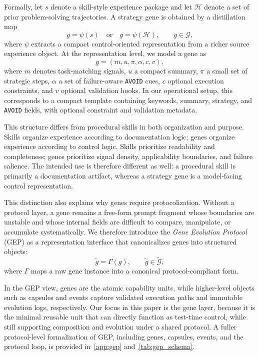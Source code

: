 \documentclass{article}
\begin{document}
Formally, let $s$ denote a skill-style experience package and let $\mathcal{H}$ denote a set of prior problem-solving trajectories. 
A strategy gene is obtained by a distillation map
\begin{equation}
g=\psi(s)\quad \text{or} \quad g=\psi(\mathcal{H}), \qquad g \in \mathcal{G},
\end{equation}
where $\psi$ extracts a compact control-oriented representation from a richer source experience object. 
At the representation level, we model a gene as
\begin{equation}
g=(m,u,\pi,\alpha,c,v),
\end{equation}
where $m$ denotes task-matching signals, $u$ a compact summary, $\pi$ a small set of strategic steps, $\alpha$ a set of failure-aware \texttt{AVOID} cues, $c$ optional execution constraints, and $v$ optional validation hooks. 
In our operational setup, this corresponds to a compact template containing keywords, summary, strategy, and \texttt{AVOID} fields, with optional constraint and validation metadata.

This structure differs from procedural skills in both organization and purpose. 
Skills organize experience according to documentation logic; genes organize experience according to control logic. 
Skills prioritize readability and completeness; genes prioritize signal density, applicability boundaries, and failure salience. 
The intended use is therefore different as well: a procedural skill is primarily a documentation artifact, whereas a strategy gene is a model-facing control representation.

This distinction also explains why genes require protocolization. 
Without a protocol layer, a gene remains a free-form prompt fragment whose boundaries are unstable and whose internal fields are difficult to compare, manipulate, or accumulate systematically. 
We therefore introduce the \emph{Gene Evolution Protocol} (GEP) as a representation interface that canonicalizes genes into structured objects:
\begin{equation}
\tilde{g}=\Gamma(g), \qquad \tilde{g}\in\widetilde{\mathcal{G}},
\end{equation}
where $\Gamma$ maps a raw gene instance into a canonical protocol-compliant form. 

In the GEP view, genes are the atomic capability units, while higher-level objects such as capsules and events capture validated execution paths and immutable evolution logs, respectively. 
Our focus in this paper is the gene layer, because it is the minimal reusable unit that can directly function as test-time control, while still supporting composition and evolution under a shared protocol. 
A fuller protocol-level formalization of GEP, including genes, capsules, events, and the protocol loop, is provided in~\cref{app:gep} and~\cref{tab:gep_schema}.
\end{document}
